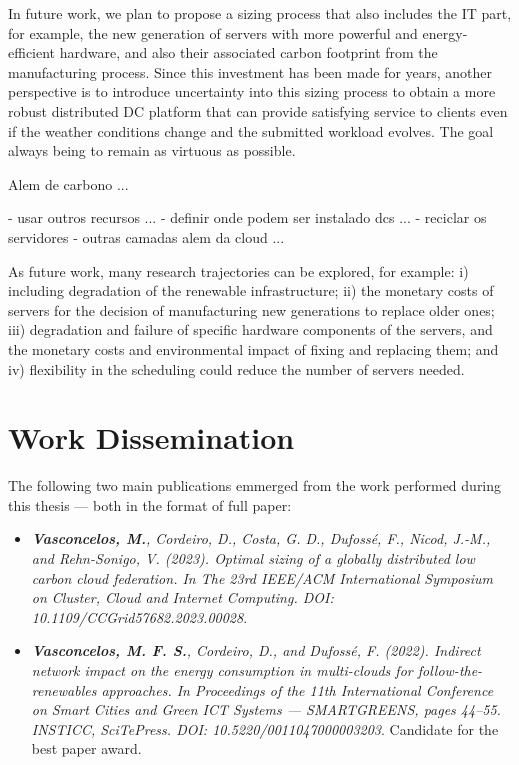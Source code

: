 In future work, we plan to propose a sizing process that also includes the IT part, for example, the new generation of servers with more powerful and energy-efficient hardware, and also their associated carbon footprint from the manufacturing process. Since this investment has been made for years, another perspective is to introduce uncertainty into this sizing process to obtain a more robust distributed DC platform that can provide satisfying service to clients even if the weather conditions change and the submitted workload evolves. The goal always being to remain as virtuous as possible. 


Alem de carbono ...

- usar outros recursos ...
- definir onde podem ser instalado dcs ...
- reciclar os servidores
- outras camadas alem da cloud ...

As future work, many research trajectories can be explored, for example: i) including degradation of the renewable infrastructure; ii) the monetary costs of servers for the decision of manufacturing new generations to replace older ones; iii) degradation and failure of specific hardware components of the servers, and the monetary costs and environmental impact of fixing and replacing them; and iv) flexibility in the scheduling could reduce the number of servers needed.


\section{Work Dissemination}
\label{sec:conclusion_dissemination}

The following two main publications emmerged from the work performed during this thesis --- both in the format of full paper:

\begin{itemize}

\item  \textit{\textbf{Vasconcelos, M.}, Cordeiro, D., Costa, G. D., Dufossé, F., Nicod, J.-M., and Rehn-Sonigo, V. (2023). Optimal sizing of a globally distributed low carbon cloud federation. In The 23rd IEEE/ACM International Symposium on Cluster, Cloud and Internet Computing. DOI: 10.1109/CCGrid57682.2023.00028}.
  
\item  \textit{\textbf{Vasconcelos, M. F. S.}, Cordeiro, D., and Dufossé, F. (2022). Indirect network impact on the energy consumption in multi-clouds for follow-the-renewables approaches. In Proceedings of the 11th International Conference on Smart Cities and Green ICT Systems — SMARTGREENS, pages 44–55. INSTICC, SciTePress. DOI: 10.5220/0011047000003203}. Candidate for the best paper award.

\end{itemize}

